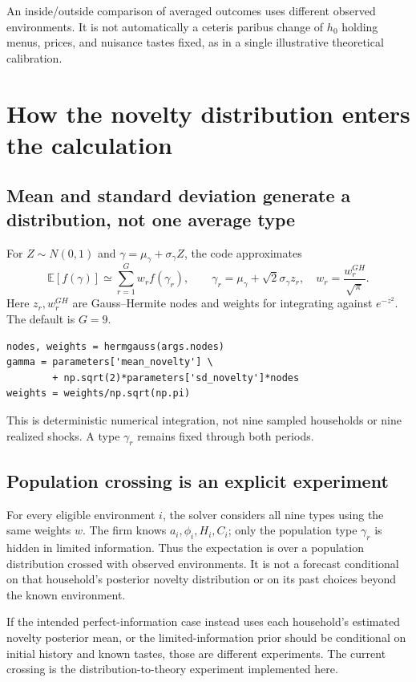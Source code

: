 \documentclass[11pt]{article}
\newcommand{\E}{\mathbb{E}}
\newcommand{\review}[1]{\begin{tcolorbox}[colback=pale,colframe=navy,title=Decision to verify]#1\end{tcolorbox}}
\begin{document}
An inside/outside comparison of averaged outcomes uses different observed environments. It is not automatically a ceteris paribus change of $h_0$ holding menus, prices, and nuisance tastes fixed, as in a single illustrative theoretical calibration.

\section{How the novelty distribution enters the calculation}
\subsection{Mean and standard deviation generate a distribution, not one average type}
For $Z\sim N(0,1)$ and $\gamma=\mu_\gamma+\sigma_\gamma Z$, the code approximates
\begin{equation}
 \E[f(\gamma)]\simeq\sum_{r=1}^{G}w_r f(\gamma_r),\qquad
 \gamma_r=\mu_\gamma+\sqrt2\sigma_\gamma z_r,\quad
 w_r=\frac{w_r^{GH}}{\sqrt\pi}.
\end{equation}
Here $z_r,w_r^{GH}$ are Gauss--Hermite nodes and weights for integrating against $e^{-z^2}$. The default is $G=9$.
\begin{lstlisting}
nodes, weights = hermgauss(args.nodes)
gamma = parameters['mean_novelty'] \
        + np.sqrt(2)*parameters['sd_novelty']*nodes
weights = weights/np.sqrt(np.pi)
\end{lstlisting}
This is deterministic numerical integration, not nine sampled households or nine realized shocks. A type $\gamma_r$ remains fixed through both periods.


\subsection{Population crossing is an explicit experiment}
For every eligible environment $i$, the solver considers all nine types using the same weights $w$. The firm knows $a_i,\phi_i,H_i,C_i$; only the population type $\gamma_r$ is hidden in limited information. Thus the expectation is over a population distribution crossed with observed environments. It is not a forecast conditional on that household's posterior novelty distribution or on its past choices beyond the known environment.

\review{If the intended perfect-information case instead uses each household's estimated novelty posterior mean, or the limited-information prior should be conditional on initial history and known tastes, those are different experiments. The current crossing is the distribution-to-theory experiment implemented here.}
\end{document}
